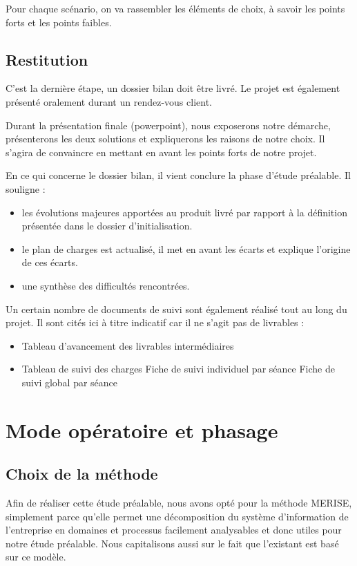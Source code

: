 {Pour chaque scénario, on va rassembler les éléments de choix, à savoir les points forts et les points faibles.


\subsection{Restitution}

C’est la dernière étape, un dossier bilan doit être livré. Le projet est également présenté oralement durant un rendez-vous client.

Durant la présentation finale (powerpoint), nous exposerons notre démarche, présenterons les deux solutions et expliquerons les raisons de notre choix. Il s’agira de convaincre en mettant en avant les points forts de notre projet.

En ce qui concerne le dossier bilan, il vient conclure la phase d’étude préalable. Il souligne :
\begin{itemize}
    \item les évolutions majeures apportées au produit livré par rapport à la définition présentée dans le dossier d’initialisation.
    \item le plan de charges est actualisé, il met en avant les écarts et explique l’origine de ces écarts.
    \item une  synthèse des difficultés rencontrées.
\end{itemize}

Un certain nombre de documents de suivi sont également réalisé tout au long du projet. Il sont cités ici à titre indicatif car il ne s’agit pas de livrables :
\begin{itemize}
    \item Tableau d’avancement des livrables intermédiaires
    \item Tableau de suivi des charges
        \subitem Fiche de suivi individuel par séance
        \subitem Fiche de suivi global par séance
\end{itemize}

\section{Mode opératoire et phasage}

\subsection{Choix de la méthode}

Afin de réaliser cette étude préalable, nous avons opté pour la méthode MERISE, simplement parce qu'elle permet une décomposition du système d'information de l'entreprise en domaines et processus facilement analysables et donc utiles pour notre étude préalable. Nous capitalisons aussi sur le fait que l’existant est basé sur ce modèle.

}
